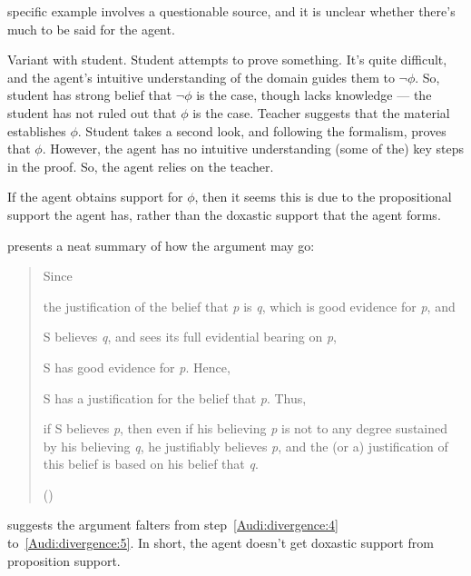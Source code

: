 \begin{note}[Example]
  \citeauthor{Lehrer:1971aa} specific example involves a questionable source, and it is unclear whether there's much to be said for the agent.

  Variant with student.
  Student attempts to prove something.
  It's quite difficult, and the agent's intuitive understanding of the domain guides them to \(\lnot\phi\).
  So, student has strong belief that \(\lnot\phi\) is the case, though lacks knowledge --- the student has not ruled out that \(\phi\) is the case.
  Teacher suggests that the material establishes \(\phi\).
  Student takes a second look, and following the formalism, proves that \(\phi\).
  However, the agent has no intuitive understanding (some of the) key steps in the proof.
  So, the agent relies on the teacher.
\end{note}

\begin{note}
  If the agent obtains support for \(\phi\), then it seems this is due to the propositional support the agent has, rather than the doxastic support that the agent forms.
\end{note}

\begin{note}
  \citeauthor{Audi:1983ux} presents a neat summary of how the argument may go:
  \begin{quote}
    Since
    \begin{enumerate*}[label=(\arabic*)]
    \item\label{Audi:divergence:1} the justification of the belief that \emph{p} is \emph{q}, which is good evidence for \emph{p}, and
    \item\label{Audi:divergence:2} S believes \emph{q}, and sees its full evidential bearing on \emph{p},
    \item\label{Audi:divergence:3} S has good evidence for \emph{p}.
      Hence,
    \item\label{Audi:divergence:4} S has a justification for the belief that \emph{p}.
      Thus,
    \item\label{Audi:divergence:5} if S believes \emph{p}, then even if his believing \emph{p} is not to any degree sustained by his believing \emph{q}, he justifiably believes \emph{p}, and the (or a) justification of this belief is based on his belief that \emph{q}.
    \end{enumerate*}
    \nolinebreak
    \mbox{}\hfill\mbox{(\citeauthor[406]{Audi:1983ux})}
  \end{quote}
  \citeauthor{Audi:1983ux} suggests the argument falters from step~\ref{Audi:divergence:4} to~\ref{Audi:divergence:5}.
  In short, the agent doesn't get doxastic support from proposition support.
\end{note}

